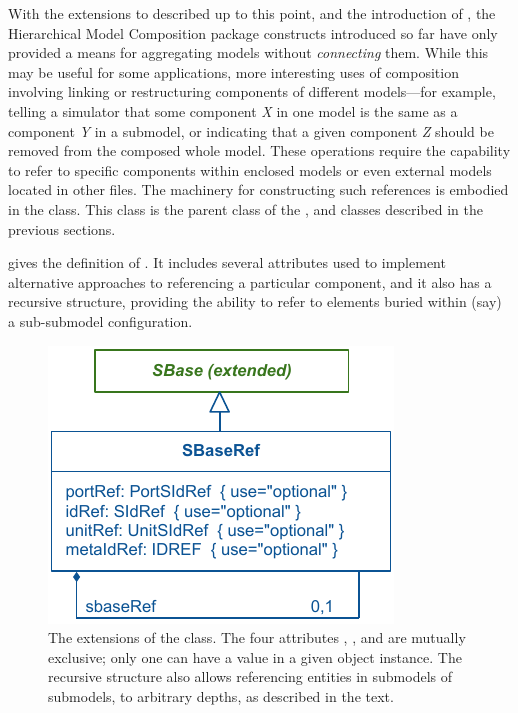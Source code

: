 With the extensions to \SBML described up to this point, and the
introduction of \ExternalModelDefinition, the Hierarchical Model
Composition package constructs introduced so far have only provided a
means for aggregating models without \emph{connecting} them.  While this
may be useful for some applications, more interesting uses of
composition involving linking or restructuring components of different
models---for example, telling a simulator that some component \emph{X}
in one model is the same as a component \emph{Y} in a submodel, or
indicating that a given component \emph{Z} should be removed from the
composed whole model.  These operations require the capability to refer
to specific components within enclosed models or even external models
located in other files.  The machinery for constructing such references
is embodied in the \SBaseRef class.  This class is the parent class of
the \Port, \Deletion and \ReplacedElement classes described in the
previous sections.

 gives the definition of \SBaseRef.  It includes
several attributes used to implement alternative approaches to
referencing a particular component, and it also has a recursive
structure, providing the ability to refer to elements buried within
(say) a sub-submodel configuration.

\begin{figure}[hbt]
  \includegraphics{figs/sbaseref-uml}
  \caption{The extensions of the \SBaseRef class.  The four attributes
    , ,  and 
    are mutually exclusive; only one can have a value in a given object
    instance.  The recursive structure also allows referencing entities
    in submodels of submodels, to arbitrary depths, as described in the
    text.}
  \label{sbaseref-uml}
\end{figure}

